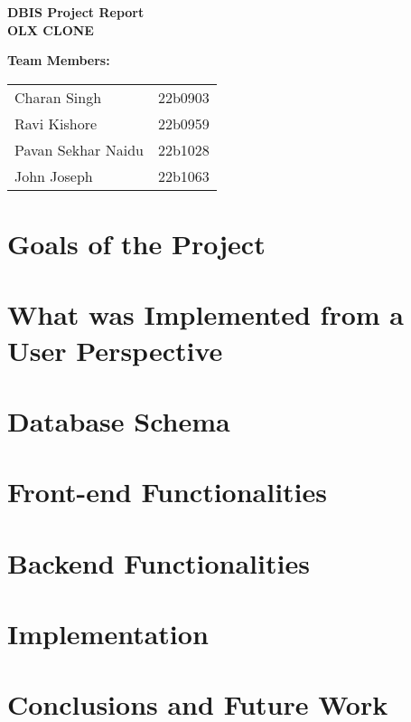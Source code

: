 \documentclass[12pt]{article}
\newcommand{\bluehref}[2]{\href{#1}{\textcolor{blue}{#2}}}
\begin{document}
\begin{titlepage}
    \centering
    \vspace*{2cm}
    
    {\Huge \textbf{DBIS Project Report \\ OLX CLONE} \par}
    \vspace{0.5cm}

    
    {\large \textbf{Team Members:} \par}
    \vspace{0.5cm}
    \begin{tabular}{ll}
        Charan Singh & 22b0903 \\
        Ravi Kishore & 22b0959 \\
        Pavan Sekhar Naidu & 22b1028 \\
        John Joseph & 22b1063 \\
    \end{tabular}
    \vspace{0.5cm}
    
    
    \tableofcontents
\end{titlepage}

\newpage

\section{Goals of the Project}

\section{What was Implemented from a User Perspective}

\section{Database Schema}

\section{Front-end Functionalities}

\section{Backend Functionalities}

\section{Implementation}

\section{Conclusions and Future Work}
\end{document}
